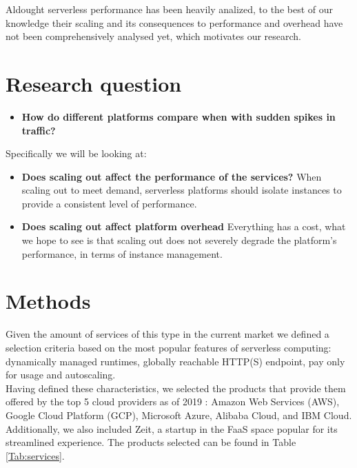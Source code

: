 \documentclass[11pt]{article}
\begin{document}
Aldought serverless performance has been heavily analized,
to the best of our knowledge their scaling and its consequences to performance
and overhead have not been comprehensively analysed yet, which motivates our research.


\section{Research question}

\begin{itemize}
\item \textbf{How do different platforms compare when with sudden spikes in traffic?}
\end{itemize}

Specifically we will be looking at:

\begin{itemize}

\item \textbf{Does scaling out affect the performance of the services?}
When scaling out to meet demand,
serverless platforms should isolate instances
to provide a consistent level of performance.

\item \textbf{Does scaling out affect platform overhead}
Everything has a cost,
what we hope to see is that scaling out does not severely degrade the platform's performance,
in terms of instance management.
\end{itemize}


\section{Methods}
\label{methods}

Given the amount of services of this type in the current market we defined a selection criteria based on the most popular features \cite{popular1} of serverless computing: dynamically managed runtimes, globally reachable HTTP(S) endpoint, pay only for usage and autoscaling. \\

Having defined these characteristics, we selected the products that provide them offered by the top 5 cloud providers as of 2019 \cite{hh}: Amazon Web Services (AWS), Google Cloud Platform (GCP), Microsoft Azure, Alibaba Cloud, and IBM Cloud. Additionally, we also included Zeit, a startup in the FaaS space popular for its streamlined experience. The products selected can be found in Table \ref{Tab:services}.
\end{document}
